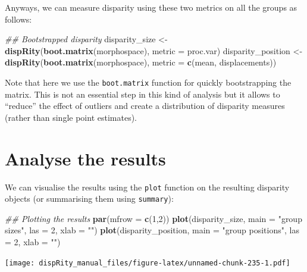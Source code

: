 \documentclass[
]{book}
\newenvironment{Shaded}{\begin{snugshade}}{\end{snugshade}}
\newcommand{\CommentTok}[1]{\textcolor[rgb]{0.56,0.35,0.01}{\textit{#1}}}
\newcommand{\DataTypeTok}[1]{\textcolor[rgb]{0.13,0.29,0.53}{#1}}
\newcommand{\DecValTok}[1]{\textcolor[rgb]{0.00,0.00,0.81}{#1}}
\newcommand{\KeywordTok}[1]{\textcolor[rgb]{0.13,0.29,0.53}{\textbf{#1}}}
\newcommand{\NormalTok}[1]{#1}
\newcommand{\StringTok}[1]{\textcolor[rgb]{0.31,0.60,0.02}{#1}}
\begin{document}
Anyways, we can measure disparity using these two metrics on all the groups as follows:

\begin{Shaded}
\begin{Highlighting}[]
\CommentTok{\#\# Bootstrapped disparity}
\NormalTok{disparity\_size \textless{}{-}}\StringTok{  }\KeywordTok{dispRity}\NormalTok{(}\KeywordTok{boot.matrix}\NormalTok{(morphospace), }\DataTypeTok{metric =}\NormalTok{ proc.var)}
\NormalTok{disparity\_position \textless{}{-}}\StringTok{ }\KeywordTok{dispRity}\NormalTok{(}\KeywordTok{boot.matrix}\NormalTok{(morphospace), }\DataTypeTok{metric =} \KeywordTok{c}\NormalTok{(mean, displacements))}
\end{Highlighting}
\end{Shaded}

Note that here we use the \texttt{boot.matrix} function for quickly bootstrapping the matrix.
This is not an essential step in this kind of analysis but it allows to ``reduce'' the effect of outliers and create a distribution of disparity measures (rather than single point estimates).

\hypertarget{analyse-the-results}{%
\section{Analyse the results}\label{analyse-the-results}}

We can visualise the results using the \texttt{plot} function on the resulting disparity objects (or summarising them using \texttt{summary}):

\begin{Shaded}
\begin{Highlighting}[]
\CommentTok{\#\# Plotting the results}
\KeywordTok{par}\NormalTok{(}\DataTypeTok{mfrow =} \KeywordTok{c}\NormalTok{(}\DecValTok{1}\NormalTok{,}\DecValTok{2}\NormalTok{))}
\KeywordTok{plot}\NormalTok{(disparity\_size, }\DataTypeTok{main =} \StringTok{"group sizes"}\NormalTok{, }\DataTypeTok{las =} \DecValTok{2}\NormalTok{, }\DataTypeTok{xlab =} \StringTok{""}\NormalTok{)}
\KeywordTok{plot}\NormalTok{(disparity\_position, }\DataTypeTok{main =} \StringTok{"group positions"}\NormalTok{, }\DataTypeTok{las =} \DecValTok{2}\NormalTok{, }\DataTypeTok{xlab =} \StringTok{""}\NormalTok{)}
\end{Highlighting}
\end{Shaded}

\texttt{[image: dispRity\_manual\_files/figure-latex/unnamed-chunk-235-1.pdf]}
\end{document}
